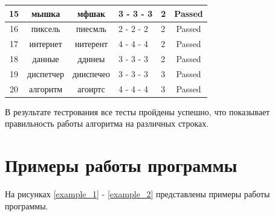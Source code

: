 \begin{table}[H]
\begin{center}
\begin{tabular}{|c|c|c|p{3cm}|p{3cm}|c|}
		\hline
		15 & мышка & мфшак & 3 - 3 - 3 & 2 & Passed\\
		\hline
		16 & пиксель & пиесмль & 2 - 2 - 2 & 2 & Passed\\
		\hline
		17 & интернет & нитерент & 4 - 4 - 4 & 2 & Passed\\
		\hline
		18 & данные & ддннеы & 3 - 3 - 3 & 2 & Passed\\
		\hline
		19 & диспетчер & дииспечео & 3 - 3 - 3 & 3 & Passed\\
		\hline
		20 & алгоритм & агоиртс & 4 - 4 - 4 & 3 & Passed\\
		\hline
	\end{tabular}
\end{center}
\end{table}
В результате тестрования все тесты пройдены успешно, что показывает правильность работы алгоритма на различных строках.

\section{Примеры работы программы}
На рисунках \ref{example_1} - \ref{example_2} представлены примеры работы программы.

